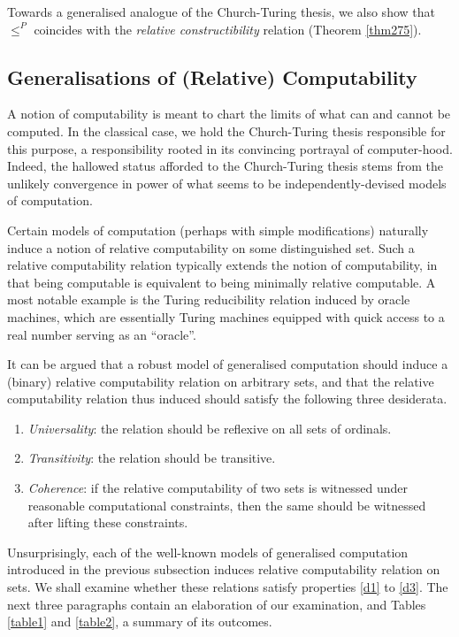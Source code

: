 \documentclass[12pt]{article}
\numberwithin{equation}{section}
\begin{document}
Towards a generalised analogue of the Church-Turing thesis, we also show that $\leq^P$ coincides with the \textit{relative constructibility} relation (Theorem \ref{thm275}). 

\subsection{Generalisations of (Relative) Computability}\label{subsec22}

A notion of computability is meant to chart the limits of what can and cannot be computed. In the classical case, we hold the Church-Turing thesis responsible for this purpose, a responsibility rooted in its convincing portrayal of computer-hood. Indeed, the hallowed status afforded to the Church-Turing thesis stems from the unlikely convergence in power of what seems to be independently-devised models of computation.

Certain models of computation (perhaps with simple modifications) naturally induce a notion of relative computability on some distinguished set. Such a relative computability relation typically extends the notion of computability, in that being computable is equivalent to being minimally relative computable. A most notable example is the Turing reducibility relation induced by oracle machines, which are essentially Turing machines equipped with quick access to a real number serving as an ``oracle''. 

It can be argued that a robust model of generalised computation should induce a (binary) relative computability relation on arbitrary sets, and that the relative computability relation thus induced should satisfy the following three desiderata.
\begin{enumerate}[leftmargin=40pt, label=(D\arabic*)]
    \item\label{d1} \textit{Universality}: the relation should be reflexive on all sets of ordinals.
    \item\label{d2} \textit{Transitivity}: the relation should be transitive.
    \item\label{d3} \textit{Coherence}: if the relative computability of two sets is witnessed under reasonable computational constraints, then the same should be witnessed after lifting these constraints.
\end{enumerate}
Unsurprisingly, each of the well-known models of generalised computation introduced in the previous subsection induces relative computability relation on sets. We shall examine whether these relations satisfy properties \ref{d1} to \ref{d3}. The next three paragraphs contain an elaboration of our examination, and Tables \ref{table1} and \ref{table2}, a summary of its outcomes.
\end{document}
